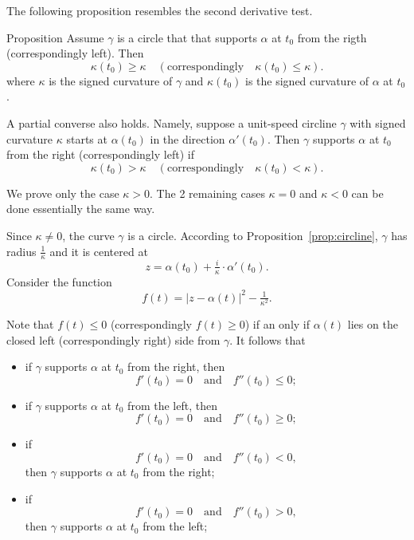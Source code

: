 The following proposition resembles the second derivative test. 

\begin{thm}{Proposition}\label{prop:supporting-circline}
Assume $\gamma$ is a circle that that supports $\alpha$ at $t_0$ from the rigth (correspondingly left).  
Then 
\[\kappa(t_0)\ge \kappa
\quad(\text{correspondingly}\quad\kappa(t_0)\le \kappa).
\] 
where $\kappa$ is the signed curvature of $\gamma$ 
and $\kappa(t_0)$ is the signed curvature of $\alpha$ at $t_0$.

A partial converse also holds.
Namely, suppose a unit-speed circline $\gamma$ with signed curvature $\kappa$ starts at $\alpha(t_0)$ in the direction $\alpha'(t_0)$.
Then $\gamma$ supports $\alpha$ at $t_0$ from the right (correspondingly left) if 
\[\kappa(t_0)> \kappa
\quad(\text{correspondingly}\quad\kappa(t_0)< \kappa).
\]

\end{thm}

We prove only the case $\kappa>0$.
The 2 remaining cases $\kappa=0$ and $\kappa<0$ can be done essentially the same way.

Since $\kappa\ne0$, the curve $\gamma$ is a circle.
According to Proposition~\ref{prop:circline},
$\gamma$ has radius $\tfrac1\kappa$ and it is centered at 
\[z=\alpha(t_0)+\tfrac i\kappa\cdot \alpha'(t_0).\]
Consider the function 
\[f(t)=|z-\alpha(t)|^2-\tfrac1{\kappa^2}.\]

Note that $f(t)\le0$ (correspondingly $f(t)\ge0$) 
if an only if $\alpha(t)$ lies on the closed left (correspondingly right) side from $\gamma$.
It follows that 
\begin{itemize}
\item if $\gamma$ supports $\alpha$ at $t_0$ from the right, 
then
\[f'(t_0)=0\quad\text{and}\quad f''(t_0)\le 0;\]

\item if $\gamma$ supports $\alpha$ at $t_0$ from  the left, 
then 
\[f'(t_0)=0\quad\text{and}\quad f''(t_0)\ge 0;\]

\item if 
\[f'(t_0)=0\quad\text{and}\quad f''(t_0)< 0,\]
then $\gamma$ supports $\alpha$ at $t_0$ from  the right;

\item if 
\[f'(t_0)=0\quad\text{and}\quad f''(t_0)> 0,\] then $\gamma$ supports $\alpha$ at $t_0$ from  the left;
\end{itemize}

